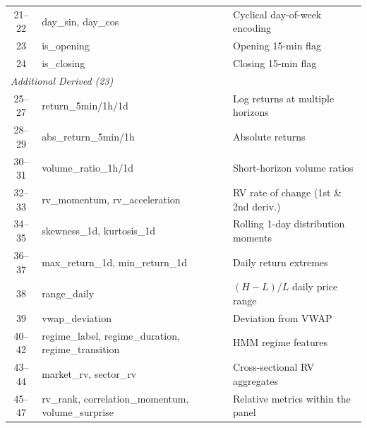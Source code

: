 \begin{table}[h!]
\begin{tabular}{c l p{9cm}}
21--22 & day\_sin, day\_cos & Cyclical day-of-week encoding \\
23 & is\_opening & Opening 15-min flag \\
24 & is\_closing & Closing 15-min flag \\
\hline
\multicolumn{3}{l}{\emph{Additional Derived (23)}} \\
25--27 & return\_5min/1h/1d & Log returns at multiple horizons \\
28--29 & abs\_return\_5min/1h & Absolute returns \\
30--31 & volume\_ratio\_1h/1d & Short-horizon volume ratios \\
32--33 & rv\_momentum, rv\_acceleration & RV rate of change (1st \& 2nd deriv.) \\
34--35 & skewness\_1d, kurtosis\_1d & Rolling 1-day distribution moments \\
36--37 & max\_return\_1d, min\_return\_1d & Daily return extremes \\
38 & range\_daily & $(H-L)/L$ daily price range \\
39 & vwap\_deviation & Deviation from VWAP \\
40--42 & regime\_label, regime\_duration, regime\_transition & HMM regime features \\
43--44 & market\_rv, sector\_rv & Cross-sectional RV aggregates \\
45--47 & rv\_rank, correlation\_momentum, volume\_surprise & Relative metrics within the panel \\
\hline
\end{tabular}
\end{table}
\vspace*{\fill}
